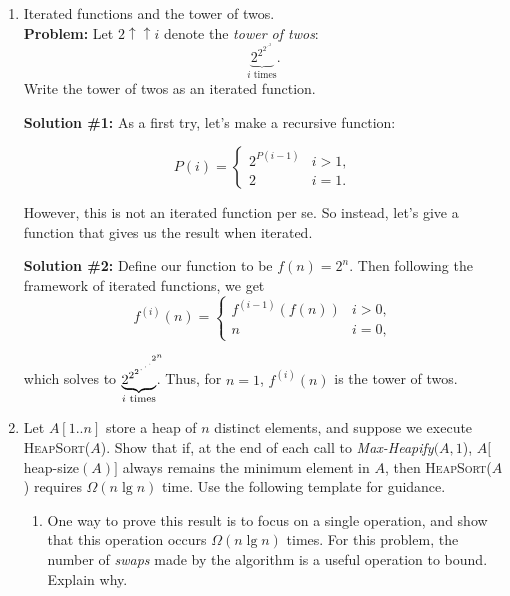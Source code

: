 \documentclass[letterpaper,11pt]{article}
\begin{document}
\thispagestyle{plain}


 \\

 \\

\begin{enumerate}
\item Iterated functions and the tower of twos.\\

\textbf{Problem:} Let $2\uparrow\uparrow i$ denote the \emph{tower of twos}:
\[\underbrace{2^{2^{2^{\iddots^2}}}}_{i \text{ times}}.\] Write the tower of twos as an iterated function.

\textbf{Solution \#1:} As a first try, let's make a recursive function:

\[P(i) = \begin{cases}2^{P(i-1)} &i > 1,\\ 2& i=1.\end{cases}\]

However, this is not an iterated function per se. So instead, let's give a function that gives us the result when iterated.

\textbf{Solution \#2:} Define our function to be $f(n) = 2^n$. Then following the framework of iterated functions, we get 
\[f^{(i)}(n) = \begin{cases}f^{(i-1)}(f(n))&i > 0,\\n&i = 0,\end{cases}\]

which solves to $\underbrace{2^{2^{2^{\iddots^{2^n\hspace{-7pt}}}}}}_{i \text{ times}}$\hspace{3pt}. Thus, for $n=1$, $f^{(i)}(n)$ is the tower of twos.

\item Let $A[1..n]$ store a heap of $n$ distinct elements, and suppose we execute \textsc{HeapSort}($A$). Show that if, at the end of each call to \emph{Max-Heapify}$(A,1$), $A[$heap-size$(A)]$ always remains the minimum element in $A$, then \textsc{HeapSort}($A$) requires $\Omega(n\lg n)$ time. Use the following template for guidance.

\begin{enumerate}
\item One way to prove this result is to focus on a single operation, and show that this operation occurs $\Omega(n\lg n)$ times. For this problem, the number of \emph{swaps} made by the algorithm is a useful operation to bound. Explain why.\\


\end{enumerate}
\end{enumerate}
\end{document}

